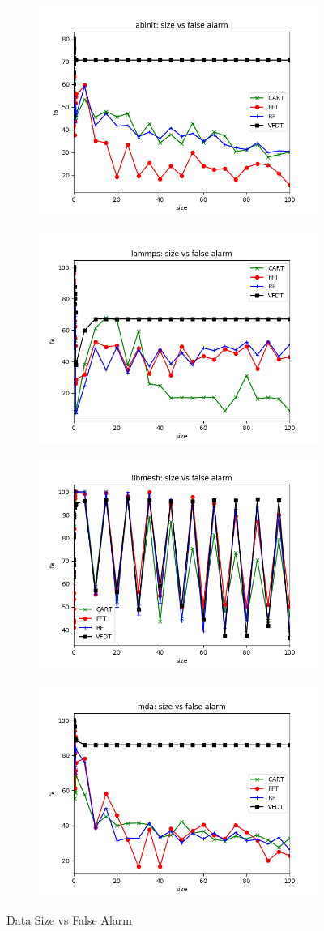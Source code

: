 \documentclass[sigplan]{acmart}\settopmatter{printfolios=true,printccs=false,printacmref=false}
\begin{document}
\begin{figure}
	\centering
	\begin{subfigure}[b]{\linewidth}
		\includegraphics[width=.49\linewidth]{fig/abinit-size-fa.png} \ 
		\includegraphics[width=.49\linewidth]{fig/lammps-size-fa.png}
	\end{subfigure}
	\begin{subfigure}[b]{\linewidth}
		\includegraphics[width=.49\linewidth]{fig/libmesh-size-fa.png} \ 
		\includegraphics[width=.49\linewidth]{fig/mda-size-fa.png}
	\end{subfigure}
	
	\caption{Data Size vs False Alarm}\label{fig:fa}
\end{figure}
\end{document}
